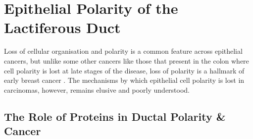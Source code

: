 \section{Epithelial Polarity of the Lactiferous Duct}


Loss of cellular organisation and polarity is a common feature across epithelial
cancers, but unlike some other cancers like those that present in the colon
where cell polarity is lost at late stages of the disease, loss of polarity is
a hallmark of early breast cancer \citep{hinck2014}. The
mechanisms by which epithelial cell polarity is lost in carcinomas, however,
remains elusive and poorly understood.\par

\subsection{The Role of Proteins in Ductal Polarity \& Cancer}

%
%
%
%
%

